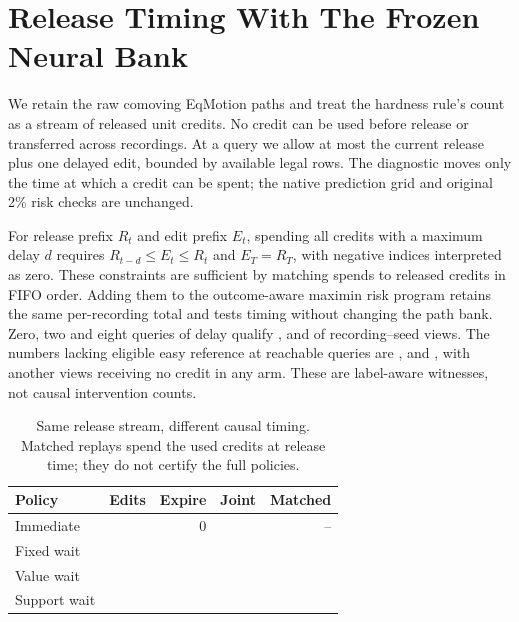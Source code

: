 \section{Release Timing With The Frozen Neural Bank}

We retain the raw comoving EqMotion paths and treat the
hardness rule's count as a stream of released unit credits.
No credit can be used before release or transferred across
recordings. At a query we allow at most the current release
plus one delayed edit, bounded by available legal rows.
The diagnostic moves only the time at which a credit can
be spent; the native prediction grid and original 2\% risk
checks are unchanged.

For release prefix $R_t$ and edit prefix $E_t$, spending
all credits with a maximum delay $d$ requires
$R_{t-d}\leq E_t\leq R_t$ and $E_T=R_T$, with negative
indices interpreted as zero. These constraints are sufficient
by matching spends to released credits in FIFO order.
Adding them to the outcome-aware maximin risk program
retains the same per-recording total and tests timing
without changing the path bank. Zero, two and eight
queries of delay qualify \NeuralCreditFixed{}, \NeuralCreditShort{}
and \NeuralCreditLong{} of \NeuralCreditViews{} recording--seed views.
The numbers lacking eligible easy reference at reachable
queries are \NeuralCreditFixedNoEasy{}, \NeuralCreditShortNoEasy{} and
\NeuralCreditLongNoEasy{}, with another \NeuralCreditNoRelease{} views
receiving no credit in any arm. These are label-aware
witnesses, not causal intervention counts.

\begin{table}[h]
\centering
\caption{Same release stream, different causal timing.
Matched replays spend the used credits at release time;
they do not certify the full policies.}
\small
\begin{tabular}{lrrrr}
\toprule
Policy & Edits & Expire & Joint & Matched \\
\midrule
Immediate & \NeuralCreditNowEdits{} & 0 & \NeuralCreditNowJoint{} & -- \\
Fixed wait & \NeuralCreditDelayEdits{} & \NeuralCreditDelayExpired{} & \NeuralCreditDelayJoint{} & \NeuralCreditDelayMatchedJoint{} \\
Value wait & \NeuralCreditValueEdits{} & \NeuralCreditValueExpired{} & \NeuralCreditValueJoint{} & \NeuralCreditValueMatchedJoint{} \\
Support wait & \NeuralCreditSupportEdits{} & \NeuralCreditSupportExpired{} & \NeuralCreditSupportJoint{} & \NeuralCreditSupportMatchedJoint{} \\
\bottomrule
\end{tabular}
\end{table}


